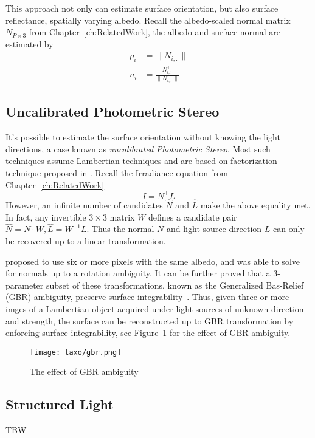This approach not only can estimate surface orientation, but also surface reflectance, \ie spatially varying albedo. Recall the albedo-scaled normal matrix $N_{P\times 3}$ from Chapter~\ref{ch:RelatedWork}, the albedo and surface normal are estimated by
\begin{align*}
\rho_i &= \|N_{i,:}\|\\
n_i &= \frac{N_{i,:}^\top}{\|N_{i,:}\|}
\end{align*}

\subsection{Uncalibrated Photometric Stereo}
It's possible to estimate the surface orientation without knowing the light directions, a case known as \textit{uncalibrated Photometric Stereo}. Most such techniques assume Lambertian techniques and are based on factorization technique proposed in \cite{hayakawa1994photometric}. Recall the Irradiance equation from Chapter~\ref{ch:RelatedWork}
$$
I=N^\top L
$$
However, an infinite number of candidates $\hat{N}$ and $\hat{L}$ make the above equality met. In fact, any invertible $3\times 3$ matrix $W$ defines a candidate pair $\hat{N} = N\cdot W, \hat{L}=W^{-1}L$. Thus the normal $N$ and light source direction $L$ can only be recovered up to a linear transformation.

\citeauthor{hayakawa1994photometric} proposed to use six or more pixels with the same albedo, and was able to solve for normals up to a rotation ambiguity. It can be further proved that a 3-parameter subset of these transformations, known as the Generalized Bas-Relief (GBR) ambiguity, preserve surface integrability~\cite{belhumeur1999bas}. Thus, given three or more imges of a Lambertian object acquired under light sources of unknown direction and strength, the surface can be reconstructed up to GBR transformation by enforcing surface integrability, see Figure~\ref{fig:gbr} for the effect of GBR-ambiguity.
\begin{figure}[!htbp]
\centering
\texttt{[image: taxo/gbr.png]}
\caption{The effect of GBR ambiguity}
\label{fig:gbr}
\end{figure}

\subsection{Structured Light}
TBW

